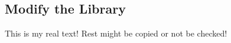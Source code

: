 \subsection{Modify the Library} \label{subsection:counter-modifications-library}
This is my real text! Rest might be copied or not be checked!
